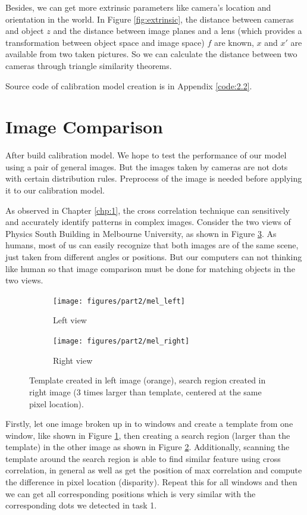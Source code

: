 Besides, we can get more extrinsic parameters like camera's location and orientation in the world. In Figure \ref{fig:extrinsic}, the distance between cameras and object $z$ and the distance between image planes and a lens (which provides a transformation between object space and image space) $f$ are known, $x$ and $x'$ are available from two taken pictures. So we can calculate the distance between two cameras through triangle similarity theorems.

Source code of calibration model creation is in Appendix \ref{code:2.2}.

\section{Image Comparison}

After build calibration model. We hope to test the performance of our model using a pair of general images. But the images taken by cameras are not dots with certain distribution rules. Preprocess of the image is needed before applying it to our calibration model. 

As observed in Chapter \ref{chp:1}, the cross correlation technique can sensitively and accurately identify patterns in complex images. Consider the two views of Physics South Building in Melbourne University, as shown in Figure \ref{fig:mel}. As humans, most of us can easily recognize that both images are of the same scene, just taken from different angles or positions. But our computers can not thinking like human so that image comparison must be done for matching objects in the two views. 

\begin{figure}[h!]
	\centering
	\begin{subfigure}[t]{0.48\linewidth}
		\centering
		\texttt{[image: figures/part2/mel\_left]}
		\caption{Left view}
		\label{fig:mel_left}
	\end{subfigure}
	\begin{subfigure}[t]{0.48\linewidth}
		\centering
		\texttt{[image: figures/part2/mel\_right]}
		\caption{Right view}
		\label{fig:mel_right}
	\end{subfigure}
	\caption{Template created in left image (orange), search region created in right image (3 times larger than template, centered at the same pixel location).}
	\label{fig:mel}
\end{figure}

Firstly, let one image broken up in to windows and create a template from one window, like shown in Figure \ref{fig:mel_left}, then creating a search region (larger than the template) in the other image as shown in Figure \ref{fig:mel_right}. Additionally, scanning the template around the search region is able to find similar feature using cross correlation, in general as well as get the position of max correlation and compute the difference in pixel location (disparity). Repeat this for all windows and then we can get all corresponding positions which is very similar with the corresponding dots we detected in task 1.

